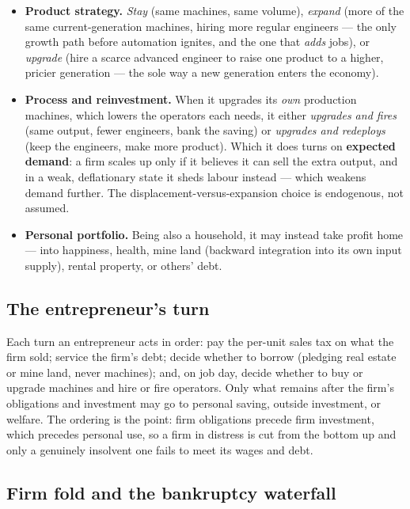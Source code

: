 \documentclass[11pt]{article}
\begin{document}
\begin{itemize}
  \item \textbf{Product strategy.} \emph{Stay} (same machines, same volume),
  \emph{expand} (more of the same current-generation machines, hiring more
  regular engineers --- the only growth path before automation ignites, and the
  one that \emph{adds} jobs), or \emph{upgrade} (hire a scarce advanced engineer
  to raise one product to a higher, pricier generation --- the sole way a new
  generation enters the economy).
  \item \textbf{Process and reinvestment.} When it upgrades its \emph{own}
  production machines, which lowers the operators each needs, it either
  \emph{upgrades and fires} (same output, fewer engineers, bank the saving) or
  \emph{upgrades and redeploys} (keep the engineers, make more product). Which
  it does turns on \textbf{expected demand}: a firm scales up only if it
  believes it can sell the extra output, and in a weak, deflationary state it
  sheds labour instead --- which weakens demand further. The
  displacement-versus-expansion choice is endogenous, not assumed.
  \item \textbf{Personal portfolio.} Being also a household, it may instead take
  profit home --- into happiness, health, mine land (backward integration into
  its own input supply), rental property, or others' debt.
\end{itemize}

\subsection{The entrepreneur's turn}
\label{sec:entrepreneur-turn}

Each turn an entrepreneur acts in order: pay the per-unit sales tax on what the
firm sold; service the firm's debt; decide whether to borrow (pledging real
estate or mine land, never machines); and, on job day, decide whether to buy or
upgrade machines and hire or fire operators. Only what remains after the firm's
obligations and investment may go to personal saving, outside investment, or
welfare. The ordering is the point: firm obligations precede firm investment,
which precedes personal use, so a firm in distress is cut from the bottom up and
only a genuinely insolvent one fails to meet its wages and debt.

\subsection{Firm fold and the bankruptcy waterfall}
\label{sec:fold}
\end{document}

